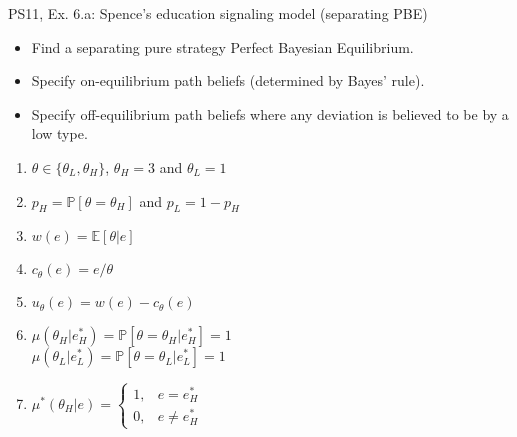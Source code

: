 \begin{frame}{PS11, Ex. 6.a: Spence’s education signaling model (separating PBE)}
    \begin{itemize}
      \item[(a)] Find a separating pure strategy Perfect Bayesian Equilibrium.
    \end{itemize}\vspace{-8pt}
    \begin{multicols}{2}
      \begin{itemize}
        \item[Step 1:] Specify on-equilibrium path beliefs (determined by Bayes' rule).
        \item[Step 2:] Specify off-equilibrium path beliefs where any deviation is believed to be by a low type.
      \end{itemize}
      \vfill\null\columnbreak
      \begin{enumerate}
        \item[Types:] $\theta\in\{\theta_L,\theta_H\}$, $\theta_H=3$ and $\theta_L=1$
        \item[Prob.:] $p_H=\mathbb{P}[\theta=\theta_H]$ and $p_L=1-p_H$
        \item[Wage:] $w(e)=\mathbb{E}[\theta|e]$
        \item[Cost:] $c_\theta(e)=e/\theta$
        \item[Utility:] $u_\theta(e)=w(e)-c_\theta(e)$
        \item $\mu\left(\theta_H|e_H^*\right)=
               \mathbb{P}\left[\theta=\theta_H|e_H^*\right]=1$\\
              $\mu\left(\theta_L|e_L^*\right)=
               \mathbb{P}\left[\theta=\theta_L|e_L^*\right]=1$
        \item $\mu^*(\theta_H|e)=\left\{\begin{array}{ll}
                  1, & e = e_H^* \\
                  0, & e \neq e_H^*
               \end{array}\right.$
      \end{enumerate}
      \vfill\null
    \end{multicols}
\end{frame}
